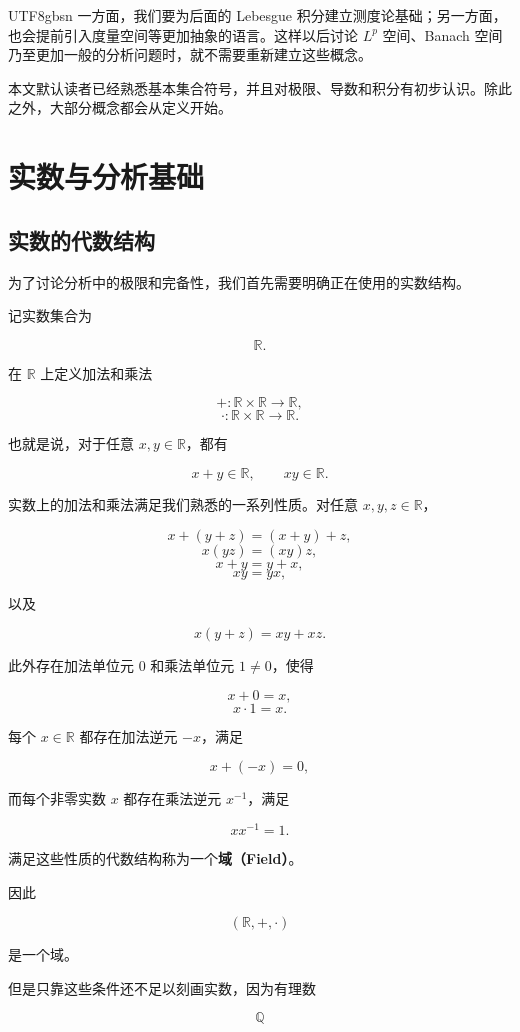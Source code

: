 \documentclass[11pt]{article}
\begin{document}
\begin{CJK*}{UTF8}{gbsn}
一方面，我们要为后面的 Lebesgue 积分建立测度论基础；另一方面，也会提前引入度量空间等更加抽象的语言。这样以后讨论 $L^{p}$ 空间、Banach 空间乃至更加一般的分析问题时，就不需要重新建立这些概念。

本文默认读者已经熟悉基本集合符号，并且对极限、导数和积分有初步认识。除此之外，大部分概念都会从定义开始。

\section{实数与分析基础}

\subsection{实数的代数结构}

为了讨论分析中的极限和完备性，我们首先需要明确正在使用的实数结构。

记实数集合为

\[
\mathbb{R}.
\]

在 $\mathbb{R}$ 上定义加法和乘法

\[
+:\mathbb{R}\times\mathbb{R}\rightarrow\mathbb{R},
\]
\[
\cdot:\mathbb{R}\times\mathbb{R}\rightarrow\mathbb{R}.
\]

也就是说，对于任意 $x,y\in\mathbb{R}$，都有

\[
x+y\in\mathbb{R},\qquad xy\in\mathbb{R}.
\]

实数上的加法和乘法满足我们熟悉的一系列性质。对任意 $x,y,z\in\mathbb{R}$，

\[
x+(y+z)=(x+y)+z,
\]
\[
x(yz)=(xy)z,
\]
\[
x+y=y+x,
\]
\[
xy=yx,
\]

以及

\[
x(y+z)=xy+xz.
\]

此外存在加法单位元 $0$ 和乘法单位元 $1\ne0$，使得

\[
x+0=x,
\]
\[
x\cdot1=x.
\]

每个 $x\in\mathbb{R}$ 都存在加法逆元 $-x$，满足

\[
x+(-x)=0,
\]

而每个非零实数 $x$ 都存在乘法逆元 $x^{-1}$，满足

\[
xx^{-1}=1.
\]

满足这些性质的代数结构称为一个\textbf{域（Field）}。

因此

\[
(\mathbb{R},+,\cdot)
\]

是一个域。

但是只靠这些条件还不足以刻画实数，因为有理数

\[
\mathbb{Q}
\]


\end{CJK*}
\end{document}
